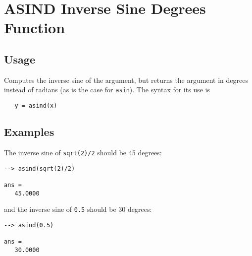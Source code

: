 \section{ASIND Inverse Sine Degrees Function}

\subsection{Usage}

Computes the inverse sine of the argument, but returns
the argument in degrees instead of radians (as is the case
for \verb|asin|). The syntax for its use is
\begin{verbatim}
   y = asind(x)
\end{verbatim}
\subsection{Examples}

The inverse sine of \verb|sqrt(2)/2| should be 45 degrees:
\begin{verbatim}
--> asind(sqrt(2)/2)

ans = 
   45.0000 
\end{verbatim}
and the inverse sine of \verb|0.5| should be 30 degrees:
\begin{verbatim}
--> asind(0.5)

ans = 
   30.0000 
\end{verbatim}
